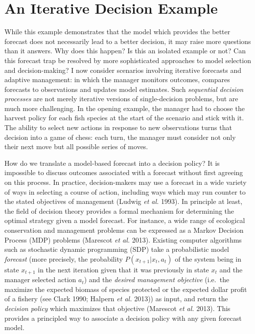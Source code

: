 \documentclass[3p]{elsarticle} %
\begin{document}
\hypertarget{an-iterative-decision-example}{%
\section{An Iterative Decision
Example}\label{an-iterative-decision-example}}

While this example demonstrates that the model which provides the better
forecast does not necessarily lead to a better decision, it may raise
more questions than it answers. Why does this happen? Is this an
isolated example or not? Can this forecast trap be resolved by more
sophisticated approaches to model selection and decision-making? I now
consider scenarios involving iterative forecasts and adaptive
management: in which the manager monitors outcomes, compares forecasts
to observations and updates model estimates. Such \emph{sequential
decision processes} are not merely iterative versions of single-decision
problems, but are much more challenging. In the opening example, the
manager had to choose the harvest policy for each fish species at the
start of the scenario and stick with it. The ability to select new
actions in response to new observations turns that decision into a game
of chess: each turn, the manager must consider not only their next move
but all possible series of moves.

How do we translate a model-based forecast into a decision policy? It is
impossible to discuss outcomes associated with a forecast without first
agreeing on this process. In practice, decision-makers may use a
forecast in a wide variety of ways in selecting a course of action,
including ways which may run counter to the stated objectives of
management (Ludwig \emph{et al.} 1993). In principle at least, the field
of decision theory provides a formal mechanism for determining the
optimal strategy given a model forecast. For instance, a wide range of
ecological conservation and management problems can be expressed as a
Markov Decision Process (MDP) problems (Marescot \emph{et al.} 2013).
Existing computer algorithms such as stochastic dynamic programming
(SDP) take a probabilistic model \emph{forecast} (more precisely, the
probability \(P(x_{t+1} | x_t, a_t)\) of the system being in state
\(x_{t+1}\) in the next iteration given that it was previously in state
\(x_t\) and the manager selected action \(a_t\)) and the \emph{desired
management objective} (i.e.~the maximize the expected biomass of species
protected or the expected dollar profit of a fishery (see Clark 1990;
Halpern \emph{et al.} 2013)) as input, and return the \emph{decision
policy} which maximizes that objective (Marescot \emph{et al.} 2013).
This provides a principled way to associate a decision policy with any
given forecast model.
\end{document}
